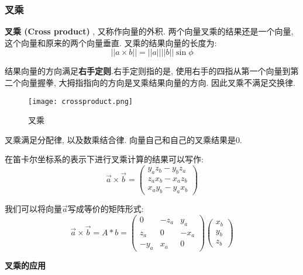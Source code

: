 \subsubsection{叉乘}

\textbf{叉乘 (Cross product) }, 又称作向量的外积. 两个向量叉乘的结果还是一个向量, 这个向量和原来的两个向量垂直. 叉乘的结果向量的长度为: 
\begin{equation}
	||a\times b||=||a||||b||\sin\phi
\end{equation}

结果向量的方向满足\textbf{右手定则}.右手定则指的是, 使用右手的四指从第一个向量到第二个向量握拳, 大拇指指向的方向是叉乘结果向量的方向. 因此叉乘不满足交换律. 

\begin{figure}[H]
	\centering
	\texttt{[image: crossproduct.png]}
	\caption{叉乘}
	\label{fig:corssproduct}
\end{figure}

叉乘满足分配律, 以及数乘结合律. 向量自己和自己的叉乘结果是0.

在笛卡尔坐标系的表示下进行叉乘计算的结果可以写作: 
\begin{equation}
	\overrightarrow{a} \times \overrightarrow{b} = \begin{pmatrix}
		y_az_b-y_bz_a\\ 
		z_ax_b-x_az_b\\
		x_ay_b-y_ax_b
	\end{pmatrix}
\end{equation}

我们可以将向量$	\overrightarrow{a}$写成等价的矩阵形式: 
\begin{equation}
	\overrightarrow{a} \times \overrightarrow{b} = 
	A*b=\begin{pmatrix}
		0&-z_a&y_a\\
		z_a& 0& -x_a\\
		-y_a & x_a & 0
	\end{pmatrix} 
	\begin{pmatrix}
		x_b\\
		y_b\\
		z_b
	\end{pmatrix} 
\end{equation}

\textbf{叉乘的应用}


